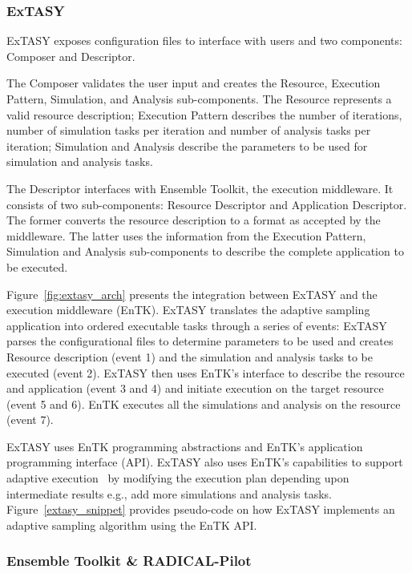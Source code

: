 \subsubsection{ExTASY}



ExTASY exposes configuration files to interface with users and two components:
Composer and Descriptor.

The Composer validates the user input and creates the Resource, Execution
Pattern, Simulation, and Analysis sub-components. The Resource represents a
valid resource description; Execution Pattern describes the number of
iterations, number of simulation tasks per iteration and number of analysis
tasks per iteration; Simulation and Analysis describe the parameters to be
used for simulation and analysis tasks.

The Descriptor interfaces with Ensemble Toolkit, the execution middleware. It
consists of two sub-components: Resource Descriptor and Application
Descriptor. The former converts the resource description to a format as
accepted by the middleware. The latter uses the information from the Execution
Pattern, Simulation and Analysis sub-components to describe the complete
application to be executed.


Figure~\ref{fig:extasy_arch} presents the integration between ExTASY and the
execution middleware (EnTK). ExTASY translates the adaptive sampling
application into ordered executable tasks through a series of events: ExTASY
parses the configurational files to determine parameters to be used and
creates Resource description (event 1) and the simulation and analysis tasks
to be executed (event 2). ExTASY then uses EnTK's interface to describe the
resource and application (event 3 and 4) and initiate execution on the target
resource (event 5 and 6). EnTK executes all the simulations and analysis on
the resource (event 7).


ExTASY uses EnTK programming abstractions and EnTK's application programming
interface (API). ExTASY also uses EnTK's capabilities to support adaptive
execution~\cite{balasubramanian2019adaptive} by modifying the execution plan
depending upon intermediate results e.g., add more simulations and analysis
tasks. Figure~\ref{extasy_snippet} provides pseudo-code on how ExTASY
implements an adaptive sampling algorithm using the EnTK API.


\subsubsection{Ensemble Toolkit \& RADICAL-Pilot}

